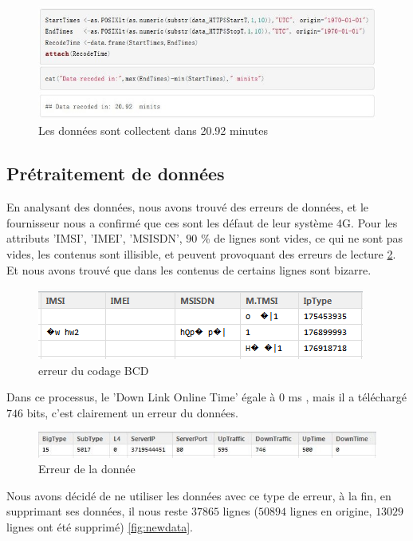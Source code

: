       
      \begin{figure}[H]
\centering
\includegraphics[width=15Cm]{images/lasttime}
\caption{Les données sont collectent dans 20.92 minutes}
\label{fig:lasttime}
\end{figure}

\subsection{Prétraitement de données}
En analysant des données, nous avons trouvé des erreurs de données, et le fournisseur nous a confirmé que ces sont les défaut de leur système 4G. Pour les attributs 'IMSI', 'IMEI', 'MSISDN', $90$ \% de lignes sont vides, ce qui ne sont pas vides, les contenus sont illisible, et peuvent provoquant des erreurs de lecture \ref{fig:errorData}. Et nous avons trouvé que dans les contenus de certains lignes sont bizarre. 
\begin{figure}[H]
	\centering
	\includegraphics[width=0.7\linewidth]{images/errorData}
	\caption{erreur du codage BCD}
	\label{fig:errorData}
\end{figure}
Dans ce processus, le 'Down Link Online Time' égale à  $0$ ms , mais il a téléchargé $746$ bits, c'est clairement un erreur du données.
\begin{figure}[H]
	\centering
	\includegraphics[width=0.9\linewidth]{images/bizarre}
	\caption{Erreur de la donnée}
	\label{fig:bizarre}
\end{figure}

 Nous avons décidé de ne utiliser les données avec ce type de erreur, à la fin, en supprimant ses données, il nous reste $37865$ lignes ($50894$ lignes en origine, $13029$ lignes ont été supprimé)  \ref{fig:newdata}.
 
